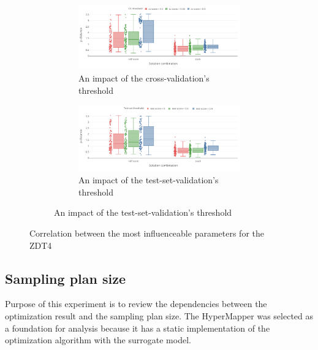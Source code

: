     \begin{figure}
        \centering
        \begin{subfigure}{\textwidth}
            \begin{subfigure}{0.45\textwidth}
                \includegraphics[width=\textwidth]{content/images/conf_zdt4_cv_score}
                \caption{An impact of the cross-validation's threshold}
                \label{fig:zdt4_pred_solver}
            \end{subfigure} 
            \begin{subfigure}{0.45\textwidth}
                \includegraphics[width=\textwidth]{content/images/conf_zdt4_test_score}
                \caption{An impact of the test-set-validation's threshold}
                \label{fig:zdt4_comb_valid}
            \end{subfigure}
        \end{subfigure}


        \caption[Correlation between the most influenceable parameters for the ZDT4]{Correlation between the most influenceable parameters for the ZDT4} 
        \label{fig:conf_zdt4_sign}    
    \end{figure}

    \subsection{Sampling plan size}
    Purpose of this experiment is to review the dependencies between the optimization result and the sampling plan size. The HyperMapper was selected as a foundation for analysis because it has a static implementation of the optimization algorithm with the surrogate model.

